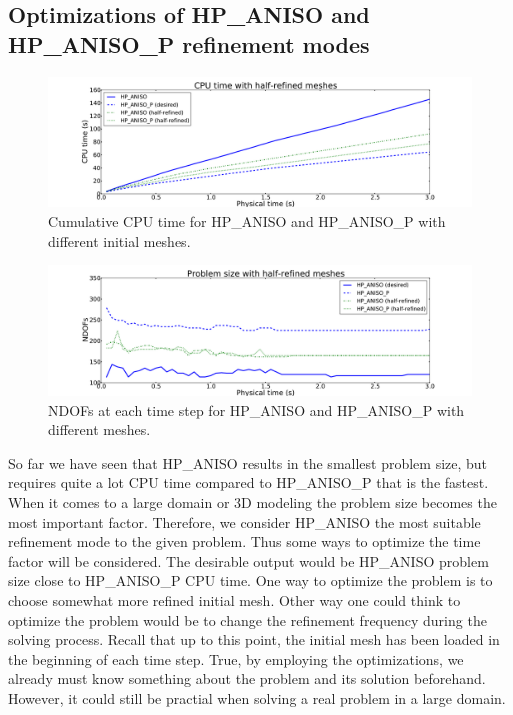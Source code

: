 \subsection{Optimizations of HP\_ANISO and HP\_ANISO\_P refinement modes}

\begin{figure}
  \begin{centering}
  \includegraphics[width=\columnwidth]{refined_cpu}
  \caption{\label{fig:refined-cpu} Cumulative CPU time for HP\_ANISO and HP\_ANISO\_P
  with different initial meshes.}
  \end{centering}
\end{figure}

\begin{figure}
  \begin{centering}
  \includegraphics[width=\columnwidth]{refined_dof}
  \caption{\label{fig:refined-dof} NDOFs at each time step for
  HP\_ANISO and HP\_ANISO\_P with different meshes.}
  \end{centering}
\end{figure}

So far we have seen that HP\_ANISO results in the smallest problem size, but requires
quite a lot CPU time compared to HP\_ANISO\_P that is the fastest.
When it comes to a large domain or 3D modeling the problem
size becomes the most important factor. Therefore, we consider HP\_ANISO the most
suitable refinement mode to the given problem. Thus some ways to optimize the time
factor will be considered. The desirable output would be HP\_ANISO problem size
close to HP\_ANISO\_P CPU time. One way to optimize the problem
is to choose somewhat more refined initial mesh. Other way one could think
to optimize the problem would be to change
the refinement frequency during the solving process. Recall that up to this point,
the initial mesh has been loaded in the beginning of each time step. True,
by employing the optimizations, we already must know something about the problem
and its solution beforehand. However, it could still be practial when solving a real problem
in a large domain.

